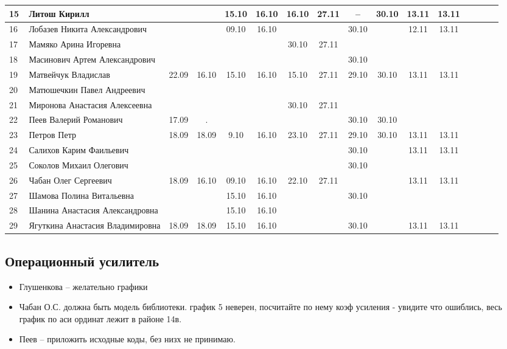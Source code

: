 \begin{tabular}{l|llccccccccccccc}
15\,& Литош Кирилл                    &     &     &15.10&16.10 &16.10&27.11 & --  &30.10&13.11&13.11\\
\midrule
16\,& Лобазев Никита Александрович    &     &     &09.10&16.10 &     &      &30.10&     &12.11&13.11\\
17\,& Мамяко Арина Игоревна           &     &     &     &      &30.10&27.11 \\
18\,& Масинович Артем Александрович   &     &     &     &      &     &      &30.10&\\
19\,& Матвейчук Владислав             &22.09&16.10&15.10&16.10 &15.10&27.11 &29.10&30.10&13.11&13.11\\
20\,& Матюшечкин Павел Андреевич      \\
\midrule
21\,& Миронова Анастасия Алексеевна   &     &     &     &      &30.10&27.11&\\
22\,& Пеев Валерий Романович          &17.09& .   &     &      &     &      &30.10&30.10\\
23\,& Петров Петр                     &18.09&18.09& 9.10&16.10 &23.10&27.11 &29.10&30.10&13.11&13.11\\
24\,& Салихов Карим Фаильевич         &     &     &     &      &     &      &30.10&     &13.11&13.11\\
25\,& Соколов Михаил Олегович         &     &     &     &      &     &      &30.10&\\
\midrule
26\,& Чабан Олег Сергеевич            &18.09&16.10&09.10&16.10&22.10 &27.11 &     &     &13.11&13.11\\
27\,& Шамова Полина Витальевна        &    &      &15.10&16.10 &     &      &30.10&\\
28\,& Шанина Анастасия Александровна  &    &      &15.10&16.10 &     &      &\\
29\,& Ягуткина Анастасия Владимировна &18.09&18.09&15.10&16.10 &     &      &30.10&     &13.11&13.11\\
\bottomrule
\end{tabular}


\subsection*{Операционный усилитель}
\begin{itemize}
\item Глушенкова -- желательно графики
\item Чабан О.С. должна быть модель библиотеки. график 5 неверен, посчитайте по нему коэф усиления - увидите что ошиблись, весь график по аси ординат лежит в районе 14в.
\item Пеев  -- приложить исходные коды, без низх не принимаю.
\end{itemize}

